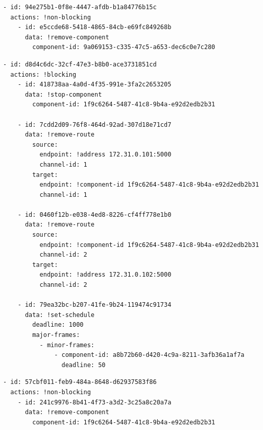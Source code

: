 \begin{lstlisting}[caption=Demonstration configuration 2 task E (Yaml), label={lst:configDemonstration2e},captionpos=b]
- id: 94e275b1-0f8e-4447-afdb-b1a84776b15c
  actions: !non-blocking
    - id: e5ccde68-5418-4865-84cb-e69fc849268b
      data: !remove-component
        component-id: 9a069153-c335-47c5-a653-dec6c0e7c280
\end{lstlisting}

\begin{lstlisting}[caption=Demonstration configuration 3 task A (Yaml), label={lst:configDemonstration3a},captionpos=b]
- id: d8d4c6dc-32cf-47e3-b8b0-ace3731851cd
  actions: !blocking
    - id: 418738aa-4a0d-4f35-991e-3fa2c2653205
      data: !stop-component
        component-id: 1f9c6264-5487-41c8-9b4a-e92d2edb2b31

    - id: 7cdd2d09-76f8-464d-92ad-307d18e71cd7
      data: !remove-route
        source:
          endpoint: !address 172.31.0.101:5000
          channel-id: 1
        target:
          endpoint: !component-id 1f9c6264-5487-41c8-9b4a-e92d2edb2b31
          channel-id: 1

    - id: 0460f12b-e038-4ed8-8226-cf4ff778e1b0
      data: !remove-route
        source:
          endpoint: !component-id 1f9c6264-5487-41c8-9b4a-e92d2edb2b31
          channel-id: 2
        target:
          endpoint: !address 172.31.0.102:5000
          channel-id: 2

    - id: 79ea32bc-b207-41fe-9b24-119474c91734
      data: !set-schedule
        deadline: 1000
        major-frames:
          - minor-frames:
              - component-id: a8b72b60-d420-4c9a-8211-3afb36a1af7a
                deadline: 50
\end{lstlisting}

\begin{lstlisting}[caption=Demonstration configuration 3 task B (Yaml), label={lst:configDemonstration3b},captionpos=b]
- id: 57cbf011-feb9-484a-8648-d62937583f86
  actions: !non-blocking
    - id: 241c9976-8b41-4f73-a3d2-3c25a8c20a7a
      data: !remove-component
        component-id: 1f9c6264-5487-41c8-9b4a-e92d2edb2b31
\end{lstlisting}



